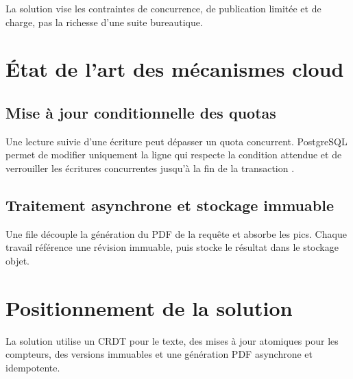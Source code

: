 La solution vise les contraintes de concurrence, de publication limitée et de charge, pas la richesse d'une suite bureautique.

\section{État de l'art des mécanismes cloud}

\subsection{Mise à jour conditionnelle des quotas}

Une lecture suivie d'une écriture peut dépasser un quota concurrent. PostgreSQL permet de modifier uniquement la ligne qui respecte la condition attendue et de verrouiller les écritures concurrentes jusqu'à la fin de la transaction \cite{postgresupdate,postgreslocks}.

\subsection{Traitement asynchrone et stockage immuable}

Une file découple la génération du PDF de la requête et absorbe les pics. Chaque travail référence une révision immuable, puis stocke le résultat dans le stockage objet.

\section{Positionnement de la solution}

La solution utilise un CRDT pour le texte, des mises à jour atomiques pour les compteurs, des versions immuables et une génération PDF asynchrone et idempotente.
